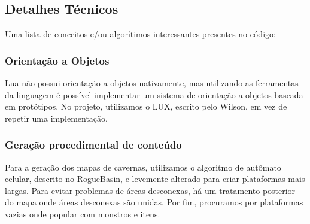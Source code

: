   \subsection{Detalhes Técnicos}
    Uma lista de conceitos e/ou algorítimos interessantes presentes no código:
    
    \subsubsection{Orientação a Objetos}
      Lua não possui orientação a objetos nativamente, mas utilizando as ferramentas da linguagem é possível
      implementar um sistema de orientação a objetos baseada em protótipos.
      No projeto, utilizamos o LUX\footnotemark{}, escrito pelo Wilson, em vez de repetir uma implementação.
      
    
    \subsubsection{Geração procedimental de conteúdo}
      Para a geração dos mapas de cavernas, utilizamos o algoritmo de autômato celular, descrito no RogueBasin,
      \cite{roguebasin:cellularautomata} e levemente alterado para criar plataformas mais largas. Para
      evitar problemas de áreas desconexas, há um tratamento posterior do mapa onde áreas desconexas são unidas.
      Por fim, procuramos por plataformas vazias onde popular com monstros e itens.
